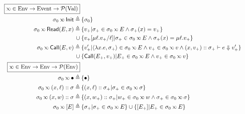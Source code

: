 \documentclass{article}
\begin{document}
\begin{figure}
	\begin{align*}
		\fbox{$\semlink\in\Ctx\rightarrow\Event\rightarrow\pset(\Value)$}                                                                                                                                  \\
		\ctx_0\semlink\InitE\triangleq                         & \: \{\ctx_0\}                                                                                                                             \\
		\ctx_0\semlink\ReadE(\event,x)\triangleq               & \: \{v_+|\ctx_+\in\ctx_0\semlink\event\land\ctx_+(x)=v_+\}                                                                                \\
		\cup                                                   & \: \{v_+[\mu\ell.v_+/\ell]|\ctx_+\in\ctx_0\semlink E\land\ctx_+(x)=\mu\ell.v_+\}                                                          \\
		\ctx_0\semlink\CallE(\event,v)\triangleq               & \: \{v_+'|\langle\lambda x.e,\ctx_+\rangle\in\ctx_0\semlink E\land v_+\in\ctx_0\semlink v\land(x,v_+)\cons\ctx_+\vdash e\Downarrow v_+'\} \\
		\cup                                                   & \: \{\CallE(\event_+,v_+)|\event_+\in\ctx_0\semlink E\land v_+\in\ctx_0\semlink v\}                                                       \\
		\fbox{$\semlink\in\Ctx\rightarrow\Ctx\rightarrow\pset(\Ctx)$}                                                                                                                                      \\
		\ctx_0\semlink\bullet\triangleq                        & \: \{\bullet\}                                                                                                                            \\
		\ctx_0\semlink(x,\ell)\cons\ctx\triangleq              & \: \{(x,\ell)\cons\ctx_+|\ctx_+\in\ctx_0\semlink\ctx\}                                                                                    \\
		\ctx_0\semlink(x,w)\cons\ctx\triangleq                 & \: \{(x,w_+)\cons\ctx_+|w_+\in\ctx_0\semlink w\land\ctx_+\in\ctx_0\semlink\ctx\}                                                          \\
		\ctx_0\semlink[E]\triangleq                            & \: \{\ctx_+|\ctx_+\in\ctx_0\semlink\event\}\cup\{[\event_+]|\event_+\in\ctx_0\semlink\event\}                                             \\

\end{align*}
\end{figure}
\end{document}
